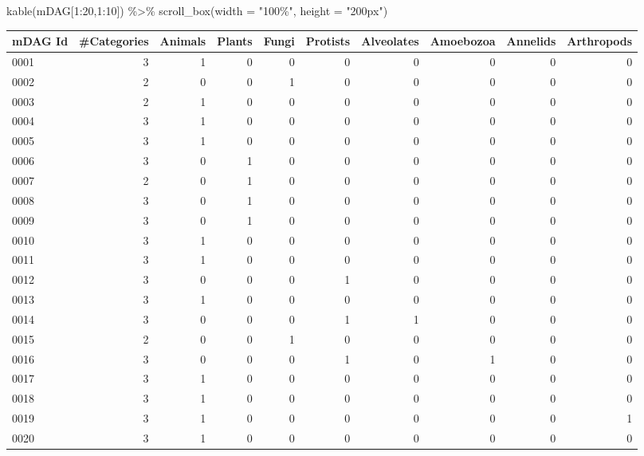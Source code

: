\documentclass[
  letterpaper,
  DIV=11,
  numbers=noendperiod]{scrreprt}
\newenvironment{Shaded}{}{}
\newcommand{\AttributeTok}[1]{\textcolor[rgb]{0.78,0.47,0.87}{#1}}
\newcommand{\DecValTok}[1]{\textcolor[rgb]{0.82,0.60,0.40}{#1}}
\newcommand{\FunctionTok}[1]{\textcolor[rgb]{0.38,0.69,0.94}{#1}}
\newcommand{\NormalTok}[1]{\textcolor[rgb]{0.67,0.70,0.75}{#1}}
\newcommand{\SpecialCharTok}[1]{\textcolor[rgb]{0.34,0.71,0.76}{#1}}
\newcommand{\StringTok}[1]{\textcolor[rgb]{0.60,0.76,0.47}{#1}}
\begin{document}
\begin{Shaded}
\begin{Highlighting}[]
\FunctionTok{kable}\NormalTok{(mDAG[}\DecValTok{1}\SpecialCharTok{:}\DecValTok{20}\NormalTok{,}\DecValTok{1}\SpecialCharTok{:}\DecValTok{10}\NormalTok{]) }\SpecialCharTok{\%\textgreater{}\%}   \FunctionTok{scroll\_box}\NormalTok{(}\AttributeTok{width =} \StringTok{"100\%"}\NormalTok{, }\AttributeTok{height =} \StringTok{"200px"}\NormalTok{)}
\end{Highlighting}
\end{Shaded}

\begin{tabular}{l|r|r|r|r|r|r|r|r|r}
\hline
mDAG Id & \#Categories & Animals & Plants & Fungi & Protists & Alveolates & Amoebozoa & Annelids & Arthropods\\
\hline
0001 & 3 & 1 & 0 & 0 & 0 & 0 & 0 & 0 & 0\\
\hline
0002 & 2 & 0 & 0 & 1 & 0 & 0 & 0 & 0 & 0\\
\hline
0003 & 2 & 1 & 0 & 0 & 0 & 0 & 0 & 0 & 0\\
\hline
0004 & 3 & 1 & 0 & 0 & 0 & 0 & 0 & 0 & 0\\
\hline
0005 & 3 & 1 & 0 & 0 & 0 & 0 & 0 & 0 & 0\\
\hline
0006 & 3 & 0 & 1 & 0 & 0 & 0 & 0 & 0 & 0\\
\hline
0007 & 2 & 0 & 1 & 0 & 0 & 0 & 0 & 0 & 0\\
\hline
0008 & 3 & 0 & 1 & 0 & 0 & 0 & 0 & 0 & 0\\
\hline
0009 & 3 & 0 & 1 & 0 & 0 & 0 & 0 & 0 & 0\\
\hline
0010 & 3 & 1 & 0 & 0 & 0 & 0 & 0 & 0 & 0\\
\hline
0011 & 3 & 1 & 0 & 0 & 0 & 0 & 0 & 0 & 0\\
\hline
0012 & 3 & 0 & 0 & 0 & 1 & 0 & 0 & 0 & 0\\
\hline
0013 & 3 & 1 & 0 & 0 & 0 & 0 & 0 & 0 & 0\\
\hline
0014 & 3 & 0 & 0 & 0 & 1 & 1 & 0 & 0 & 0\\
\hline
0015 & 2 & 0 & 0 & 1 & 0 & 0 & 0 & 0 & 0\\
\hline
0016 & 3 & 0 & 0 & 0 & 1 & 0 & 1 & 0 & 0\\
\hline
0017 & 3 & 1 & 0 & 0 & 0 & 0 & 0 & 0 & 0\\
\hline
0018 & 3 & 1 & 0 & 0 & 0 & 0 & 0 & 0 & 0\\
\hline
0019 & 3 & 1 & 0 & 0 & 0 & 0 & 0 & 0 & 1\\
\hline
0020 & 3 & 1 & 0 & 0 & 0 & 0 & 0 & 0 & 0\\
\hline
\end{tabular}
\end{document}
